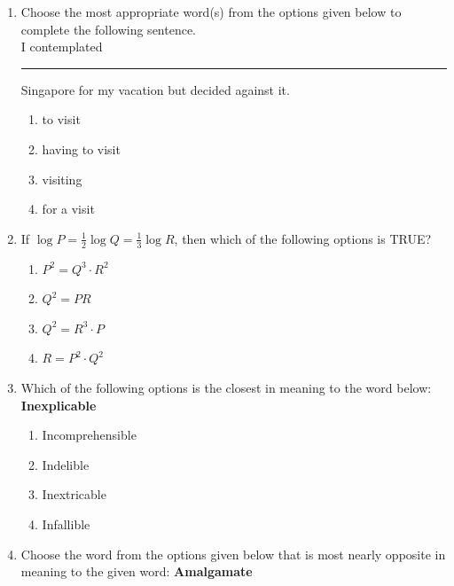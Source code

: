 \documentclass[journal,12pt,onecolumn]{IEEEtran}
\begin{document}
\begin{enumerate}
\item Choose the most appropriate word(s) from the options given below to complete the following sentence.\\
I contemplated \rule{2cm}{0.15mm} Singapore for my vacation but decided against it.

\hfill{}

\begin{multicols}{2}
\begin{enumerate}
    \item to visit
    \item having to visit
    \item visiting
    \item for a visit
\end{enumerate}
\end{multicols}

\item If $\log P = \frac{1}{2} \log Q = \frac{1}{3} \log R$, then which of the following options is TRUE?

\hfill{}

\begin{multicols}{2}
\begin{enumerate}
    \item $P^{2} = Q^{3} \cdot R^{2}$
    \item $Q^{2} = PR$
    \item $Q^{2} = R^{3} \cdot P$
    \item $R = P^{2} \cdot Q^{2}$
\end{enumerate}
\end{multicols}

\item Which of the following options is the closest in meaning to the word below: \textbf{Inexplicable}

\hfill{}

\begin{multicols}{2}
\begin{enumerate}
    \item Incomprehensible
    \item Indelible
    \item Inextricable
    \item Infallible
\end{enumerate}
\end{multicols}

\item Choose the word from the options given below that is most nearly opposite in meaning to the given word: \textbf{Amalgamate}


\end{enumerate}
\end{document}

